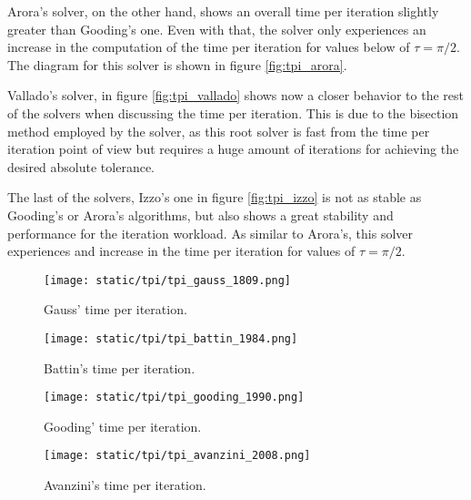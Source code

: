 Arora's solver, on the other hand, shows an overall time per iteration slightly
greater than Gooding's one. Even with that, the solver only experiences an
increase in the computation of the time per iteration for values below of
$\tau=\pi/2$. The diagram for this solver is shown in figure
\ref{fig:tpi_arora}.

Vallado's solver, in figure \ref{fig:tpi_vallado} shows now a closer behavior
to the rest of the solvers when discussing the time per iteration. This is due
to the bisection method employed by the solver, as this root solver is fast from
the time per iteration point of view but requires a huge amount of iterations
for achieving the desired absolute tolerance.

The last of the solvers, Izzo's one in figure \ref{fig:tpi_izzo} is not as
stable as Gooding's or Arora's algorithms, but also shows a great stability and
performance for the iteration workload. As similar to Arora's, this solver
experiences and increase in the time per iteration for values of $\tau=\pi/2$.


\begin{figure}[H]
  \begin{minipage}{0.48\textwidth}
    \centering
    \texttt{[image: static/tpi/tpi\_gauss\_1809.png]}
    \caption{Gauss' time per iteration.}\label{fig:tpi_gauss}
  \end{minipage}\hfill
  \begin{minipage}{0.48\textwidth}
    \centering
    \texttt{[image: static/tpi/tpi\_battin\_1984.png]}
    \caption{Battin's time per iteration.}\label{fig:tpi_battin}
  \end{minipage}
\end{figure}

\begin{figure}[H]
  \begin{minipage}{0.48\textwidth}
    \centering
    \texttt{[image: static/tpi/tpi\_gooding\_1990.png]}
    \caption{Gooding' time per iteration.}\label{fig:tpi_gooding}
  \end{minipage}\hfill
  \begin{minipage}{0.48\textwidth}
    \centering
    \texttt{[image: static/tpi/tpi\_avanzini\_2008.png]}
    \caption{Avanzini's time per iteration.}\label{fig:tpi_avanzini}
  \end{minipage}
\end{figure}


